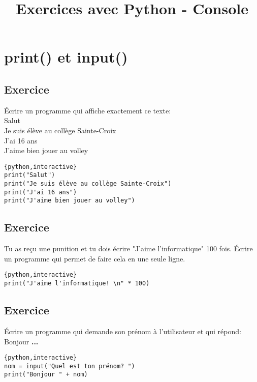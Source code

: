 \documentclass[a4paper,11pt]{article}
\begin{document}
\title{Exercices avec Python - Console}
\date{}
\maketitle

\section{print() et input()}

\subsection{Exercice}
Écrire un programme qui affiche exactement ce texte:\\
Salut\\
Je suis élève au collège Sainte-Croix\\
J'ai 16 ans\\
J'aime bien jouer au volley\\
\begin{solution}
\begin{verbatim}{python,interactive}
print("Salut")
print("Je suis élève au collège Sainte-Croix")
print("J'ai 16 ans")
print("J'aime bien jouer au volley")
\end{verbatim}
\end{solution}

\subsection{Exercice}
Tu as reçu une punition et tu dois écrire "J'aime l'informatique" 100 fois.
Écrire un programme qui permet de faire cela en une seule ligne.
\begin{solution}
\begin{verbatim}{python,interactive}
print("J'aime l'informatique! \n" * 100)
\end{verbatim}
\end{solution}

\subsection{Exercice}
Écrire un programme qui demande son prénom à l'utilisateur et qui répond:\\
Bonjour \textbf{...}\\
\begin{solution}
\begin{verbatim}{python,interactive}
nom = input("Quel est ton prénom? ")
print("Bonjour " + nom)
\end{verbatim}
\end{solution}
\end{document}
